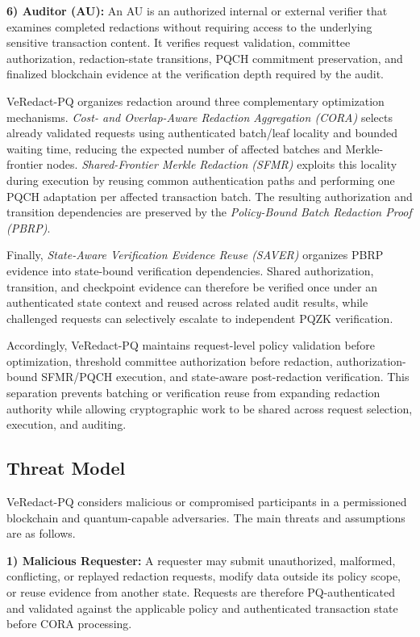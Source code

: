 \documentclass[lettersize,journal]{IEEEtran}
\begin{document}
\textbf{6) Auditor (AU):}
An AU is an authorized internal or external verifier that examines
completed redactions without requiring access to the underlying
sensitive transaction content. It verifies request validation,
committee authorization, redaction-state transitions, PQCH commitment
preservation, and finalized blockchain evidence at the verification
depth required by the audit.

\medskip
VeRedact-PQ organizes redaction around three complementary optimization
mechanisms. \emph{Cost- and Overlap-Aware Redaction Aggregation (CORA)}
selects already validated requests using authenticated batch/leaf
locality and bounded waiting time, reducing the expected number of
affected batches and Merkle-frontier nodes. \emph{Shared-Frontier
Merkle Redaction (SFMR)} exploits this locality during execution by
reusing common authentication paths and performing one PQCH adaptation
per affected transaction batch. The resulting authorization and
transition dependencies are preserved by the
\emph{Policy-Bound Batch Redaction Proof (PBRP)}.

Finally, \emph{State-Aware Verification Evidence Reuse (SAVER)}
organizes PBRP evidence into state-bound verification dependencies.
Shared authorization, transition, and checkpoint evidence can therefore
be verified once under an authenticated state context and reused across
related audit results, while challenged requests can selectively
escalate to independent PQZK verification.

Accordingly, VeRedact-PQ maintains request-level policy validation
before optimization, threshold committee authorization before
redaction, authorization-bound SFMR/PQCH execution, and state-aware
post-redaction verification. This separation prevents batching or
verification reuse from expanding redaction authority while allowing
cryptographic work to be shared across request selection, execution,
and auditing.
\subsection{Threat Model}

VeRedact-PQ considers malicious or compromised participants in a
permissioned blockchain and quantum-capable adversaries. The main
threats and assumptions are as follows.

\textbf{1) Malicious Requester:}
A requester may submit unauthorized, malformed, conflicting, or replayed
redaction requests, modify data outside its policy scope, or reuse
evidence from another state. Requests are therefore PQ-authenticated
and validated against the applicable policy and authenticated
transaction state before CORA processing.
\end{document}
